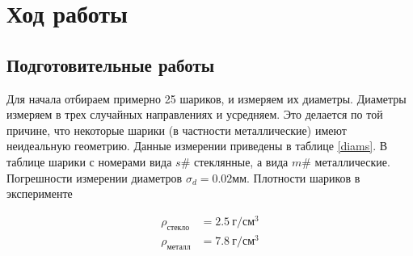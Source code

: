 \documentclass[a4paper, 12pt]{article}
\begin{document}
\section{Ход работы} \subsection{Подготовительные работы} Для начала отбираем
примерно 25 шариков, и измеряем их диаметры. Диаметры измеряем в трех случайных
направлениях и усредняем. Это делается по той причине, что некоторые шарики (в
частности металлические) имеют неидеальную геометрию. Данные измерении приведены
в таблице \ref{diams}. В таблице шарики с номерами вида $s\#$ стеклянные, а вида
$m\#$ металлические. Погрешности измерении диаметров $\sigma_d = 0.02мм$.
Плотности шариков в эксперименте

\begin{align*} \rho_{стекло} & =2.5\ \text{г}/\text{см}^3 \\ \rho_{металл} & =7.8\ \text{г}/\text{см}^3
\end{align*}
\end{document}
